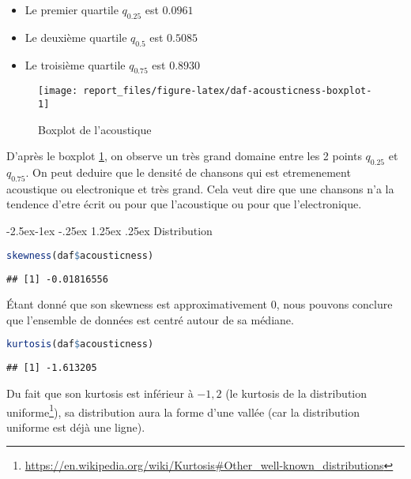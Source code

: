 \documentclass[
  11pt,
  xcolor = usenames,dvipsnames]{article}
\makeatletter
\providecommand{\tightlist}{%
  \setlength{\itemsep}{0pt}\setlength{\parskip}{0pt}}
\renewcommand\paragraph{\@startsection{paragraph}{4}{\z@}%
        {-2.5ex\@plus -1ex \@minus -.25ex}%
        {1.25ex \@plus .25ex}%
        {\normalfont\normalsize\bfseries}}
\makeatother
\begin{document}
\begin{itemize}
\tightlist
\item
  Le premier quartile \(q_{0.25}\) est \(0.0961\)
\item
  Le deuxième quartile \(q_{0.5}\) est \(0.5085\)
\item
  Le troisième quartile \(q_{0.75}\) est \(0.8930\)
\end{itemize}

\begin{figure}

{\centering \texttt{[image: report\_files/figure-latex/daf-acousticness-boxplot-1]} 

}

\caption{Boxplot de l'acoustique}\label{fig:daf-acousticness-boxplot}
\end{figure}

D'après le boxplot \ref{fig:daf-acousticness-boxplot}, on observe un très grand domaine entre les 2 points \(q_{0.25}\) et \(q_{0.75}\).
On peut deduire que le densité de chansons qui est etremenement acoustique ou electronique et très grand.
Cela veut dire que une chansons n'a la tendence d'etre écrit ou pour que l'acoustique ou pour que l'electronique.

\hypertarget{distribution}{%
\paragraph{Distribution}\label{distribution}}

\begin{lstlisting}[language=R]
skewness(daf$acousticness)
\end{lstlisting}

\begin{lstlisting}
## [1] -0.01816556
\end{lstlisting}

Étant donné que son skewness est approximativement 0, nous pouvons conclure que
l'ensemble de données est centré autour de sa médiane.

\begin{lstlisting}[language=R]
kurtosis(daf$acousticness)
\end{lstlisting}

\begin{lstlisting}
## [1] -1.613205
\end{lstlisting}

Du fait que son kurtosis est inférieur à \(-1,2\) (le kurtosis de la distribution uniforme\footnote{\url{https://en.wikipedia.org/wiki/Kurtosis\#Other_well-known_distributions}}),
sa distribution aura la forme d'une vallée (car la distribution uniforme est déjà une ligne).
\end{document}
